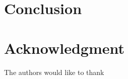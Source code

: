 \documentclass[journal, a4paper]{IEEEtran}
\begin{document}
\section{Conclusion}
\lipsum[1]


\section*{Acknowledgment}
The authors would like to thank \lipsum[1]



\ifCLASSOPTIONcaptionsoff
  \newpage
\fi






\end{document}
